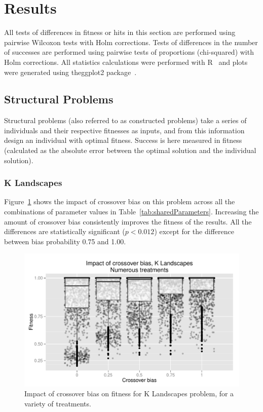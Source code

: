 \documentclass{sig-alternate}
\begin{document}
\section{Results} \label{sec:Results}

All tests of differences in fitness or hits in this section are performed using pairwise Wilcoxon tests with Holm
corrections. Tests of differences in the number of successes are performed using pairwise tests of proportions
(chi-squared) with Holm corrections. All statistics calculations were performed with R~\cite{R} and plots were
generated using the\linebreak ggplot2 package~\cite{ggplot2Book}.

\subsection{Structural Problems}

Structural problems (also referred to as constructed problems) take a series of individuals and their respective
fitnesses as inputs, and from this information design an individual with optimal fitness. Success is here measured in
fitness (calculated as the absolute error between the optimal solution and the individual solution).

\subsubsection{K Landscapes}

Figure~\ref{fig:KLandscapes6_results} shows the impact of crossover bias on this problem across all the combinations of
parameter values in Table~\ref{tab:sharedParameters}. Increasing the amount of crossover bias consistently improves the
fitness of the results. All the differences are statistically significant ($p < 0.012$) except for the difference
between bias probability 0.75 and 1.00.

%
%
%
%

\begin{figure}
\centering
\includegraphics[width=0.45 \textwidth]{Plots/KLandscapes6_XO_bias_impact_transformed_boxplot_alpha075.pdf}
\caption{Impact of crossover bias on fitness for K Landscapes problem, for a variety of treatments.}
\label{fig:KLandscapes6_results}
\end{figure}
\end{document}
